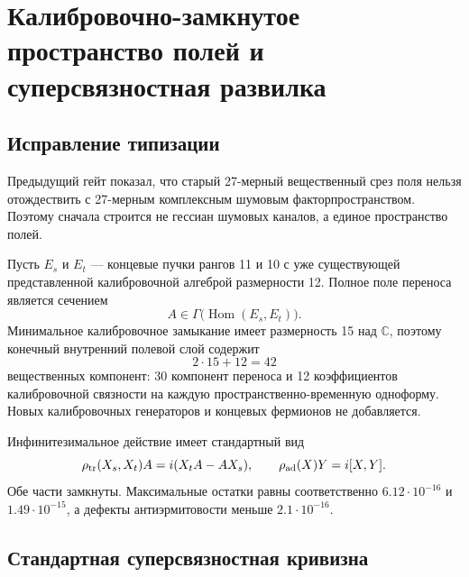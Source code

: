 \chapter{Калибровочно-замкнутое пространство полей и суперсвязностная развилка}
\label{ch:v8-gauge-closed-field-space-superconnection-gate}

\section{Исправление типизации}

Предыдущий гейт показал, что старый 27-мерный вещественный срез поля нельзя
отождествить с 27-мерным комплексным шумовым факторпространством. Поэтому сначала
строится не гессиан шумовых каналов, а единое пространство полей.

Пусть $E_s$ и $E_t$ --- концевые пучки рангов 11 и 10 с уже существующей
представленной калибровочной алгеброй размерности 12. Полное поле переноса является
сечением
\begin{equation}
 A\in\Gamma\bigl(\operatorname{Hom}(E_s,E_t)\bigr).
 \label{eq:v8-full-transfer-field-section}
\end{equation}
Минимальное калибровочное замыкание имеет размерность 15 над $\mathbb C$, поэтому
конечный внутренний полевой слой содержит
\begin{equation}
 2\cdot15+12=42
 \label{eq:v8-gauge-closed-field-real-dimension}
\end{equation}
вещественных компонент: 30 компонент переноса и 12 коэффициентов калибровочной
связности на каждую пространственно-временную одноформу. Новых калибровочных
генераторов и концевых фермионов не добавляется.

Инфинитезимальное действие имеет стандартный вид
\begin{equation}
 \rho_{\rm tr}(X_s,X_t)A=i(X_tA-AX_s),
 \qquad
 \rho_{\rm ad}(X)Y=i[X,Y].
 \label{eq:v8-field-space-infinitesimal-action}
\end{equation}
Обе части замкнуты. Максимальные остатки равны соответственно
$6.12\cdot10^{-16}$ и $1.49\cdot10^{-15}$, а дефекты
антиэрмитовости меньше $2.1\cdot10^{-16}$.

\section{Стандартная суперсвязностная кривизна}

